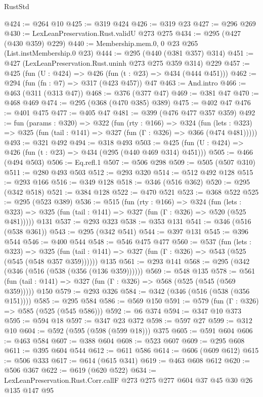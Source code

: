 \begin{lexlean}{RustStd}
\begin{coremodule}
@424 := @264 @10
@425 := @319 @424
@426 := @319 @23
@427 := @296 @269
@430 := LexLeanPreservation.Rust.validU @273 @275
@434 := @295 (@427 (@430 @359) @229)
@440 := Membership.mem.{0, 0} @23 @265 (List.instMembership.{0} @23)
@444 := @295 (@440 (@381 @357) @314)
@451 := @427 (LexLeanPreservation.Rust.uninh @273 @275 @359 @314) @229
@457 := @425 (fun (U : @424) => @426 (fun (t : @23) => @434 (@444 @451)))
@462 := @294 (fun (fn : @7) => @317 (@423 @457)) @47
@463 := And.intro
@466 := @463 (@311 (@313 @47))
@468 := @376 (@377 @47)
@469 := @381 @47
@470 := @468 @469
@474 := @295 (@368 (@470 @385) @389)
@475 := @402 @47
@476 := @401 @475
@477 := @405 @47
@481 := @399 (@476 @477 @357 @359)
@492 := fun (params : @320) =>
  @322
    (fun (rty : @166) =>
    @324
      (fun (lets : @323) => @325 (fun (tail : @141) => @327 (fun (Γ : @326) => @366 (@474 @481)))))
@493 := @321 @492
@494 := @318 @493
@503 := @425 (fun (U : @424) => @426 (fun (t : @23) => @434 (@295 (@440 @469 @314) @451)))
@505 := @466 (@494 @503)
@506 := Eq.refl.{1}
@507 := @506 @298
@509 := @505 (@507 @310)
@511 := @280 @493 @503
@512 := @293 @320
@514 := @512 @492 @128
@515 := @293 @166
@516 := @349 @128
@518 := @346 (@516 @362)
@520 := @295 (@342 @518)
@521 := @384 @128
@522 := @470 @521
@523 := @368 @522
@525 := @295 (@523 @389)
@536 := @515
    (fun (rty : @166) =>
    @324
      (fun (lets : @323) => @325 (fun (tail : @141) => @327 (fun (Γ : @326) => @520 (@525 @481)))))
    @131
@537 := @293 @323
@538 := @353 @131
@541 := @346 (@516 (@538 @361))
@543 := @295 (@342 @541)
@544 := @397 @131
@545 := @396 @544
@546 := @400 @544
@548 := @546 @475 @477
@560 := @537
    (fun (lets : @323) =>
    @325 (fun (tail : @141) => @327 (fun (Γ : @326) => @543 (@525 (@545 (@548 @357 @359))))))
    @135
@561 := @293 @141
@568 := @295 (@342 (@346 (@516 (@538 (@356 (@136 @359))))))
@569 := @548 @135
@578 := @561 (fun (tail : @141) => @327 (fun (Γ : @326) => @568 (@525 (@545 (@569 @359))))) @150
@579 := @293 @326
@584 := @342 (@346 (@516 (@538 (@356 @151))))
@585 := @295 @584
@586 := @569 @150
@591 := @579 (fun (Γ : @326) => @585 (@525 (@545 @586)))
@592 := @6 @374
@594 := @347 @10 @373
@595 := @594 @18
@597 := @347 @23 @372
@598 := @597 @27
@599 := @312 @10
@604 := @592 (@595 (@598 (@599 @18))) @375
@605 := @591 @604
@606 := @463 @584
@607 := @388 @604
@608 := @523 @607
@609 := @295 @608
@611 := @395 @604 @544
@612 := @611 @586
@614 := @606 (@609 @612)
@615 := @506 @333
@617 := @614 (@615 @341)
@619 := @463 @608 @612
@620 := @506 @367
@622 := @619 (@620 @522)
@634 := LexLeanPreservation.Rust.Corr.callF @273 @275 @277 @604 @37 @45 @30 @26 @135 @147 @95

\end{coremodule}
\end{lexlean}
